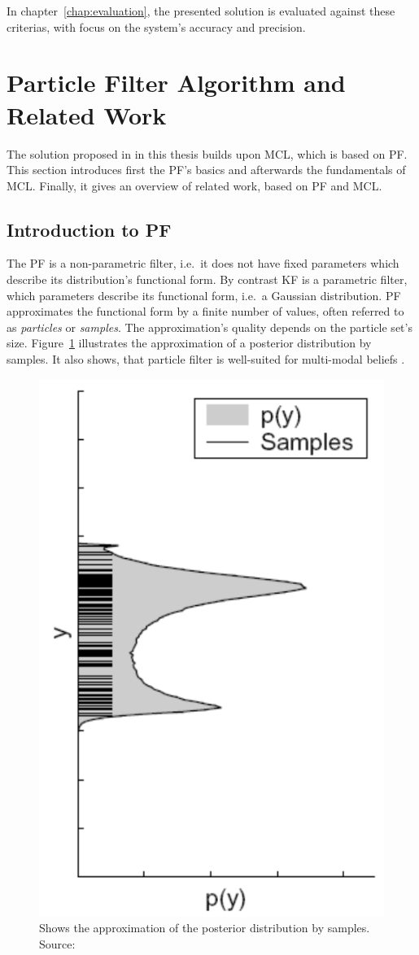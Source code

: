 \noindent In chapter~\ref{chap:evaluation}, the presented solution is evaluated against these criterias, with focus on the system's accuracy and precision.


\section{Particle Filter Algorithm and Related Work}\label{sec:fund_pf}
The solution proposed in in this thesis builds upon \acf{MCL}, which is based on \acf{PF}. This section introduces first the \ac{PF}'s basics and afterwards the fundamentals of \ac{MCL}. Finally, it gives an overview of related work, based on \ac{PF} and \ac{MCL}.

\subsection{Introduction to \acl{PF}}
The \ac{PF} is a non-parametric filter, i.e.\ it does not have fixed parameters which describe its distribution's functional form. By contrast \acf{KF} is a parametric filter, which parameters describe its functional form, i.e.\ a Gaussian distribution. \ac{PF} approximates the functional form by a finite number of values, often referred to as \emph{particles} or \emph{samples}. The approximation's quality depends on the particle set's size. Figure~\ref{fig:pf_approx} illustrates the approximation of a posterior distribution by samples. It also shows, that particle filter is well-suited for multi-modal beliefs \citep{thrun:prob_robo}.

\begin{figure}
	\includegraphics[height=0.45\textwidth]{figures/pf_approx}
	\caption{Shows the approximation of the posterior distribution by samples. Source: \citep{thrun:prob_robo}}
	\label{fig:pf_approx}
\end{figure} 


